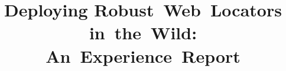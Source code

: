 \documentclass[10pt,conference]{IEEEtran}
\begin{document}
\theoremstyle{definition}
\newtheorem{defn}{Definition}[section]

\theoremstyle{definition}
\newtheorem{rqn}{RQ}[section]

\theoremstyle{definition}
\newtheorem{note}{Note}[section]

\theoremstyle{remark}
\newtheorem{ex}{Example}[section]

\newcommand{\erratum}[0]{\textsc{Erratum}\xspace}
\newcommand{\cerberus}[0]{\textsc{Cerberus}\xspace}
\newcommand{\laredoute}[0]{\textit{La\,Redoute}\xspace}
\newcommand{\erratumlong}[0]{\emph{rEpaiRing bRoken locATors Using tree Matching}}
\title{Deploying Robust~Web~Locators in~the~Wild: An~Experience~Report}
\author{
    \and
    \and
    \and
}

\maketitle
\end{document}
